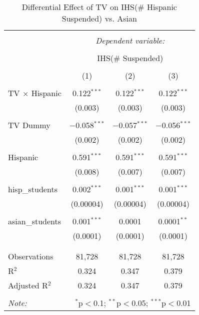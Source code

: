 
\begin{table}[!htbp] \centering 
  \caption{Differential Effect of TV on IHS(\# Hispanic Suspended) vs. Asian} 
  \label{} 
\begin{tabular}{@{\extracolsep{-2pt}}lccc} 
\\[-1.8ex]\hline 
\hline \\[-1.8ex] 
 & \multicolumn{3}{c}{\textit{Dependent variable:}} \\ 
\cline{2-4} 
\\[-1.8ex] & \multicolumn{3}{c}{IHS(\# Suspended)} \\ 
\\[-1.8ex] & (1) & (2) & (3)\\ 
\hline \\[-1.8ex] 
 TV $\times$ Hispanic & 0.122$^{***}$ & 0.122$^{***}$ & 0.122$^{***}$ \\ 
  & (0.003) & (0.003) & (0.003) \\ 
  & & & \\ 
 TV Dummy & $-$0.058$^{***}$ & $-$0.057$^{***}$ & $-$0.056$^{***}$ \\ 
  & (0.002) & (0.002) & (0.002) \\ 
  & & & \\ 
 Hispanic & 0.591$^{***}$ & 0.591$^{***}$ & 0.591$^{***}$ \\ 
  & (0.008) & (0.007) & (0.007) \\ 
  & & & \\ 
 hisp\_students & 0.002$^{***}$ & 0.001$^{***}$ & 0.001$^{***}$ \\ 
  & (0.00004) & (0.00004) & (0.00004) \\ 
  & & & \\ 
 asian\_students & 0.001$^{***}$ & 0.0001 & 0.0001$^{**}$ \\ 
  & (0.0001) & (0.0001) & (0.0001) \\ 
  & & & \\ 
\hline \\[-1.8ex] 
Observations & 81,728 & 81,728 & 81,728 \\ 
R$^{2}$ & 0.324 & 0.347 & 0.379 \\ 
Adjusted R$^{2}$ & 0.324 & 0.347 & 0.379 \\ 
\hline 
\hline \\[-1.8ex] 
\textit{Note:}  & \multicolumn{3}{r}{$^{*}$p$<$0.1; $^{**}$p$<$0.05; $^{***}$p$<$0.01} \\ 
\end{tabular} 
\end{table} 
